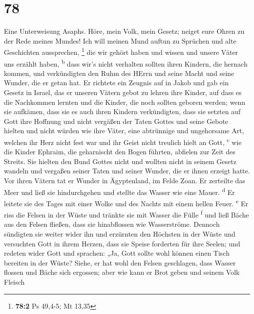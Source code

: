 \hypertarget{section-77}{%
\section{78}\label{section-77}}

 Eine Unterweisung Asaphs. Höre, mein Volk, mein Gesetz;
neiget eure Ohren zu der Rede meines Mundes!  Ich will
meinen Mund auftun zu Sprüchen und alte Geschichten aussprechen,
\footnote{\textbf{78:2} Ps 49,4-5; Mt 13,35}  die wir
gehört haben und wissen und unsere Väter uns erzählt haben,
\textsuperscript{b}  dass wir's nicht verhalten sollten
ihren Kindern, die hernach kommen, und verkündigten den Ruhm des HErrn
und seine Macht und seine Wunder, die er getan hat.  Er
richtete ein Zeugnis auf in Jakob und gab ein Gesetz in Israel, das er
unseren Vätern gebot zu lehren ihre Kinder,  auf dass es
die Nachkommen lernten und die Kinder, die noch sollten geboren werden;
wenn sie aufkämen, dass sie es auch ihren Kindern verkündigten,
 dass sie setzten auf Gott ihre Hoffnung und nicht
vergäßen der Taten Gottes und seine Gebote hielten  und
nicht würden wie ihre Väter, eine abtrünnige und ungehorsame Art,
welchen ihr Herz nicht fest war und ihr Geist nicht treulich hielt an
Gott, \textsuperscript{c}  wie die Kinder Ephraim, die
geharnischt den Bogen führten, abfielen zur Zeit des Streits.
 Sie hielten den Bund Gottes nicht und wollten nicht in
seinem Gesetz wandeln  und vergaßen seiner Taten und
seiner Wunder, die er ihnen erzeigt hatte.  Vor ihren
Vätern tat er Wunder in Ägyptenland, im Felde Zoan.  Er
zerteilte das Meer und ließ sie hindurchgehen und stellte das Wasser wie
eine Mauer. \textsuperscript{d}  Er leitete sie des Tages
mit einer Wolke und des Nachts mit einem hellen Feuer.
\textsuperscript{e}  Er riss die Felsen in der Wüste und
tränkte sie mit Wasser die Fülle \textsuperscript{f}  und
ließ Bäche aus den Felsen fließen, dass sie hinabflossen wie
Wasserströme.  Dennoch sündigten sie weiter wider ihn und
erzürnten den Höchsten in der Wüste  und versuchten Gott
in ihrem Herzen, dass sie Speise forderten für ihre Seelen;
 und redeten wider Gott und sprachen: „Ja, Gott sollte
wohl können einen Tisch bereiten in der Wüste?  Siehe, er
hat wohl den Felsen geschlagen, dass Wasser flossen und Bäche sich
ergossen; aber wie kann er Brot geben und seinem Volk Fleisch
